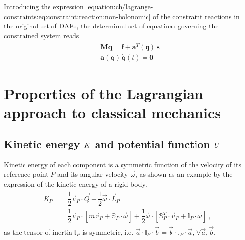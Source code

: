 \documentclass[letterpaper,10pt,english]{jupyterBook}
\begin{document}
\sphinxAtStartPar
{} Introducing the expression \eqref{equation:ch/lagrange-constraints:eq:constraint:reaction:non-holonomic} of the constraint reactions in the original set of DAEs, the determined set of equations governing the constrained system reads
\begin{equation*}
\begin{split}\begin{aligned}
  & \mathbf{M} \ddot{\mathbf{q}} = \mathbf{f} + \mathbf{a}^T(\mathbf{q}) \, \mathbf{s} \\
  & \mathbf{a}(\mathbf{q}) \, \dot{\mathbf{q}}(t) = \mathbf{0}
\end{aligned}\end{split}
\end{equation*}
\sphinxstepscope


\section{Properties of the Lagrangian approach to classical mechanics}
\label{\detokenize{ch/lagrange-properties:properties-of-the-lagrangian-approach-to-classical-mechanics}}\label{\detokenize{ch/lagrange-properties:classical-mechanics-lagrange-properties}}\label{\detokenize{ch/lagrange-properties::doc}}

\subsection{Kinetic energy \protect\(K\protect\) and potential function \protect\(U\protect\)}
\label{\detokenize{ch/lagrange-properties:kinetic-energy-k-and-potential-function-u}}\label{\detokenize{ch/lagrange-properties:classical-mechanics-lagrange-properties-kinetic-energy}}
\sphinxAtStartPar
Kinetic energy of each component is a symmetric function of the velocity of its reference point \(P\) and its angular velocity \(\vec{\omega}\), as shown as an example by the expression of the kinetic energy of a rigid body,
\begin{equation*}
\begin{split}\begin{aligned}
  K_P 
  & = \dfrac{1}{2} \vec{v}_P \cdot \vec{Q} + \dfrac{1}{2} \vec{\omega} \cdot \vec{L}_P \\
  & = \dfrac{1}{2} \vec{v}_P \cdot \left[ m \vec{v}_P + \mathbb{S}_P \cdot \vec{\omega} \right] 
    + \dfrac{1}{2} \vec{\omega} \cdot \left[ \mathbb{S}_P^T \cdot \vec{v}_P + \mathbb{I}_P \cdot \vec{\omega} \right] \ ,
\end{aligned}\end{split}
\end{equation*}
\sphinxAtStartPar
as the tensor of inertia \(\mathbb{I}_P\) is symmetric, i.e. \(\vec{a} \cdot \mathbb{I}_P \cdot \vec{b} = \vec{b} \cdot \mathbb{I}_P \cdot \vec{a}\), \(\forall \vec{a}, \vec{b}\).
\end{document}

